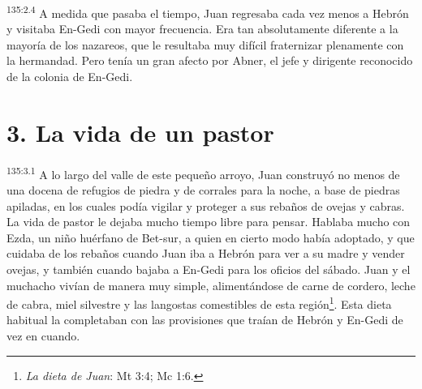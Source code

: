 \par
\textsuperscript{135:2.4} A medida que pasaba el tiempo, Juan regresaba cada vez menos a Hebrón y visitaba En-Gedi con mayor frecuencia. Era tan absolutamente diferente a la mayoría de los nazareos, que le resultaba muy difícil fraternizar plenamente con la hermandad. Pero tenía un gran afecto por Abner, el jefe y dirigente reconocido de la colonia de En-Gedi.

\section*{3. La vida de un pastor}
\par
\textsuperscript{135:3.1} A lo largo del valle de este pequeño arroyo, Juan construyó no menos de una docena de refugios de piedra y de corrales para la noche, a base de piedras apiladas, en los cuales podía vigilar y proteger a sus rebaños de ovejas y cabras. La vida de pastor le dejaba mucho tiempo libre para pensar. Hablaba mucho con Ezda, un niño huérfano de Bet-sur, a quien en cierto modo había adoptado, y que cuidaba de los rebaños cuando Juan iba a Hebrón para ver a su madre y vender ovejas, y también cuando bajaba a En-Gedi para los oficios del sábado. Juan y el muchacho vivían de manera muy simple, alimentándose de carne de cordero, leche de cabra, miel silvestre y las langostas comestibles de esta región\footnote{\textit{La dieta de Juan}: Mt 3:4; Mc 1:6.}. Esta dieta habitual la completaban con las provisiones que traían de Hebrón y En-Gedi de vez en cuando.

